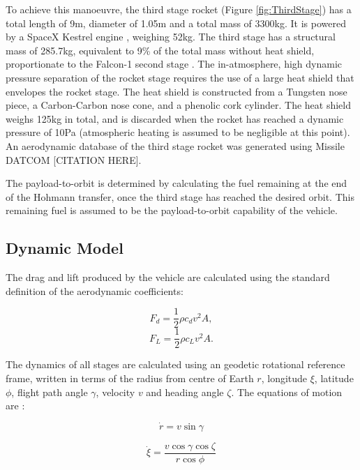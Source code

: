 \documentclass[]{aiaa-tc}
\begin{document}
To achieve this manoeuvre, the third stage rocket (Figure \ref{fig:ThirdStage}) has a total length of 9m, diameter of 1.05m and a total mass of 3300kg. It is powered by a SpaceX Kestrel engine \cite{Vehicle2008}, weighing 52kg. The third stage has a structural mass of 285.7kg, equivalent to 9\% of the total mass without heat shield, proportionate to the Falcon-1 second stage \cite{Vehicle2008}. The in-atmosphere, high dynamic pressure separation of the rocket stage requires the use of a large heat shield that envelopes the rocket stage. The heat shield is constructed from a Tungsten nose piece, a Carbon-Carbon nose cone, and a phenolic cork cylinder. The heat shield weighs 125kg in total, and is discarded when the rocket has reached a dynamic pressure of 10Pa (atmospheric heating is assumed to be negligible at this point). An aerodynamic database of the third stage rocket was generated using Missile DATCOM [CITATION HERE].

The payload-to-orbit is determined by calculating the fuel remaining at the end of the Hohmann transfer, once the third stage has reached the desired orbit. This remaining fuel is assumed to be the payload-to-orbit capability of the vehicle. 





\subsection{Dynamic Model}

The drag and lift produced by the vehicle are calculated using the standard definition of the aerodynamic coefficients:

\begin{equation}
F_d = \frac{1}{2}\rho c_d v^2 A ,
\end{equation}
\begin{equation}
F_L = \frac{1}{2}\rho c_L v^2 A .
\end{equation}

The dynamics of all stages are calculated using an geodetic rotational reference frame, written in terms of the radius from centre of Earth $r$, longitude $\xi$, latitude $\phi$, flight path angle $\gamma$, velocity $v$ and heading angle $\zeta$. The equations of motion are \cite{pontani}:


\begin{equation}
\dot{r} = v \sin \gamma
\end{equation}

\begin{equation}
\dot{\xi} = \frac{v\cos \gamma \cos \zeta}{r \cos \phi}
\end{equation}
\end{document}
